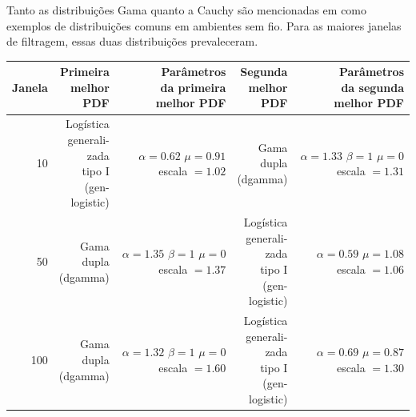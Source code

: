 \documentclass[journal,11pt,twocolumn]{IEEEtran}
\begin{document}
Tanto as distribuições Gama quanto a Cauchy são mencionadas em \cite{shadowing_book} como exemplos de distribuições comuns em ambientes sem fio. Para as maiores janelas de filtragem, essas duas distribuições prevaleceram.

\begin{table}[h!]
    \centering
    \begin{tabular}{r|r|r|r|r}
        Janela & \makecell[r]{Primeira\\ melhor\\PDF} & \makecell[r]{Parâmetros\\da primeira\\melhor PDF} & \makecell[r]{Segunda\\ melhor\\PDF} & \makecell[r]{Parâmetros\\da segunda\\melhor PDF} \\
        \hline
        10  & \makecell[r]{Logística\\generali-\\zada\\tipo I\\(gen-\\logistic)} & \makecell[r]{$\alpha=0.62$\\$\mu=0.91$\\escala $=1.02$} & \makecell[r]{Gama\\dupla\\(dgamma)} & \makecell[r]{$\alpha=1.33$\\$\beta=1$\\$\mu=0$\\escala $=1.31$}\\
        50  & \makecell[r]{Gama\\dupla\\(dgamma)} & \makecell[r]{$\alpha=1.35$\\$\beta=1$\\$\mu=0$\\escala $=1.37$} & \makecell[r]{Logística\\generali-\\zada\\tipo I\\(gen-\\logistic)} & \makecell[r]{$\alpha=0.59$\\$\mu=1.08$\\escala $=1.06$}\\
        100 & \makecell[r]{Gama\\dupla\\(dgamma)} & \makecell[r]{$\alpha=1.32$\\$\beta=1$\\$\mu=0$\\escala $=1.60$} & \makecell[r]{Logística\\generali-\\zada\\tipo I\\(gen-\\logistic)} & \makecell[r]{$\alpha=0.69$\\$\mu=0.87$\\escala $=1.30$}\\

\end{tabular}
\end{table}
\end{document}
